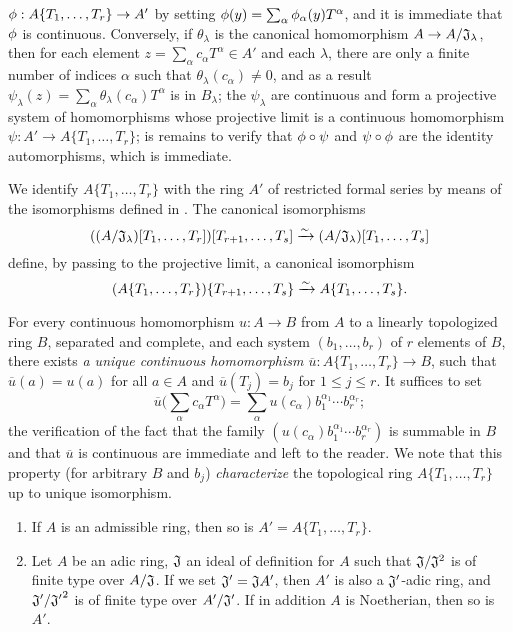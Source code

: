 \begin{env}[7.5.1]
$\vphi:A\{T_1,\dots,T_r\}\to A'$ by setting
$\phi(y)=\sum_\alpha\phi_\alpha(y)T^\alpha$, and it is immediate that $\phi$ is
continuous. Conversely, if $\theta_\lambda$ is the canonical homomorphism
$A\to A/\fk{J}_\lambda$, then for each element
$z=\sum_\alpha c_\alpha T^\alpha\in A'$ and each $\lambda$, there are only a finite
number of indices $\alpha$ such that $\theta_\lambda(c_\alpha)\neq 0$, and as a
result $\psi_\lambda(z)=\sum_\alpha\theta_\lambda(c_\alpha)T^\alpha$ is in
$B_\lambda$; the $\psi_\lambda$ are continuous and form a projective system of
homomorphisms whose projective limit is a continuous homomorphism
$\psi:A'\to A\{T_1,\dots,T_r\}$; is remains to verify that $\phi\circ\psi$ and
$\psi\circ\phi$ are the identity automorphisms, which is immediate.
\end{env}

\begin{env}[7.5.2]
\label{0.7.5.2}
We identify $A\{T_1,\dots,T_r\}$ with the ring $A'$ of restricted formal series by
means of the isomorphisms defined in . The canonical
isomorphisms
\[
  ((A/\mathfrak{J}_\lambda)[T_1,\dots,T_r])[T_{r+1},\dots,T_s]
  \xrightarrow{\sim}(A/\mathfrak{J}_\lambda)[T_1,\dots,T_s]
\]
define, by passing to the projective limit, a canonical isomorphism
\[
  (A\{T_1,\dots,T_r\})\{T_{r+1},\dots,T_s\}
  \xrightarrow{\sim} A\{T_1,\dots,T_s\}.
\]
\end{env}

\begin{env}[7.5.3]
\label{0.7.5.3}
For every continuous homomorphism $u:A\to B$ from $A$ to a linearly topologized ring
$B$, separated and complete, and each system $(b_1,\dots,b_r)$ of $r$ elements of $B$,
there exists \emph{a unique continuous homomorphism $\overline{u}:A\{T_1,\dots,T_r\}\to B$},
such that $\overline{u}(a)=u(a)$ for all $a\in A$ and $\overline{u}(T_j)=b_j$ for
$1\leqslant j\leqslant r$. It suffices to set
\[
  \overline{u}\big(\sum_\alpha c_\alpha T^\alpha\big)
  =\sum_\alpha u(c_\alpha)b_1^{\alpha_1}\cdots b_r^{\alpha_r};
\]
the verification of the fact that the family $(u(c_\alpha)b_1^{\alpha_1}\cdots b_r^{\alpha_r})$
is summable in $B$ and that $\overline{u}$ is continuous are immediate and left to the
reader. We note that this property (for arbitrary $B$ and $b_j$) \emph{characterize} the
topological ring $A\{T_1,\dots,T_r\}$ up to unique isomorphism.
\end{env}

\begin{prop}[7.5.4]
\label{0.7.5.4}
\medskip\noindent
\begin{enumerate}[label=\emph{(\roman*)}]
  \item If $A$ is an admissible ring, then so is $A'=A\{T_1,\dots,T_r\}$.
  \item Let $A$ be an adic ring, $\mathfrak{J}$ an ideal of definition for
    $A$ such that $\mathfrak{J}/\mathfrak{J}^2$ is of finite type
    over $A/\mathfrak{J}$. If we set $\mathfrak{J}'=\mathfrak{J}A'$, then $A'$ is also a
    $\mathfrak{J}'$-adic ring, and $\mathfrak{J}'/{\mathfrak{J}'}^2$ is of finite type over
    $A'/\mathfrak{J}'$. If in addition $A$ is Noetherian, then so is $A'$.
\end{enumerate}
\end{prop}

